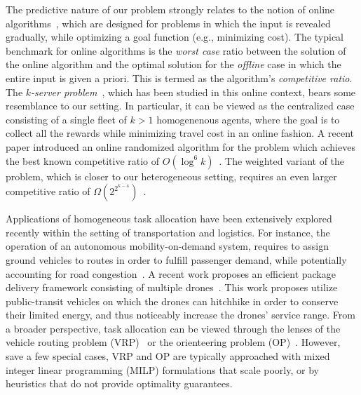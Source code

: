 \documentclass[conference]{IEEEtran}
\begin{document}
The predictive nature of our problem strongly relates to the notion of online algorithms~\cite{FiatWoeginger98,BorodinElYaniv05,HentenryckBent09}, which are designed for problems in which the input is  revealed gradually, while optimizing a goal function (e.g., minimizing cost). The typical benchmark for online algorithms is the \emph{worst case} ratio between the solution of the online algorithm and the optimal solution for the \emph{offline} case in which the entire input is given a priori. This is termed as the algorithm's \emph{competitive ratio}. The \emph{$k$-server problem}~\cite{Koutsoupias09,BertsimasETAL19}, which has been studied in this online context, bears some resemblance to our setting. In particular, it can be viewed as the centralized case consisting of a single fleet of $k>1$ homogenenous agents, where the goal is to collect all the rewards while minimizing travel cost in an online fashion. A recent paper introduced an online randomized algorithm for the problem which achieves the best known competitive ratio of $O(\log^6 k)$~\cite{Lee18}. The weighted variant of the problem, which is closer to our heterogeneous setting, requires an even larger competitive ratio of $\Omega(2^{2^{k-4}})$~\cite{BansalETAL17}. 

Applications of homogeneous task allocation have been extensively explored recently within the setting of transportation and logistics. For instance, the operation of an autonomous mobility-on-demand system, requires to assign ground vehicles to routes in order to fulfill passenger demand, while potentially accounting for road congestion~\cite{SoloveyETAL19,WallerETAL18,Levine17}. A recent work proposes an efficient package delivery framework consisting of multiple drones~\cite{ChoudhurySoloveyETAL2020}. This work proposes utilize public-transit vehicles on which the drones can hitchhike in order to conserve their limited energy, and thus noticeably increase the drones' service range. From a broader perspective, task allocation can  be viewed through the lenses of the vehicle routing problem (VRP)~\cite{TothVigo2014} or the orienteering problem (OP)~\cite{GunawanETAL16}.%
However, save a few special cases, VRP and OP  are typically approached with mixed integer linear programming (MILP) formulations that scale poorly, or by heuristics that do not provide optimality guarantees.
\end{document}

